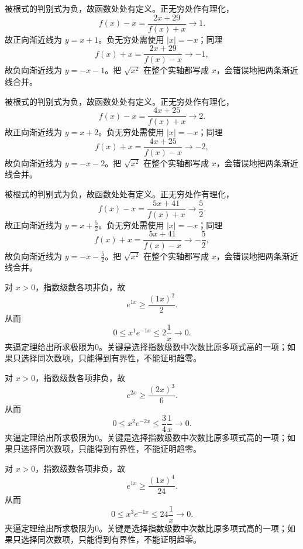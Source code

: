 \documentclass[12pt,fontset=fandol]{ctexart}
\begin{document}
\begin{solve}\label{ans:c4q4}
被根式的判别式为负，故函数处处有定义。正无穷处作有理化，
\[
f(x)-x=\frac{2x+29}{f(x)+x}\longrightarrow 1.
\]
故正向渐近线为 $y=x+1$。负无穷处需使用 $|x|=-x$；同理
\[
f(x)+x=\frac{2x+29}{f(x)-x}\longrightarrow-1,
\]
故负向渐近线为 $y=-x-1$。把 $\sqrt{x^2}$ 在整个实轴都写成 $x$，会错误地把两条渐近线合并。
\end{solve}

\begin{solve}\label{ans:c4q5}
被根式的判别式为负，故函数处处有定义。正无穷处作有理化，
\[
f(x)-x=\frac{4x+25}{f(x)+x}\longrightarrow 2.
\]
故正向渐近线为 $y=x+2$。负无穷处需使用 $|x|=-x$；同理
\[
f(x)+x=\frac{4x+25}{f(x)-x}\longrightarrow-2,
\]
故负向渐近线为 $y=-x-2$。把 $\sqrt{x^2}$ 在整个实轴都写成 $x$，会错误地把两条渐近线合并。
\end{solve}

\begin{solve}\label{ans:c4q6}
被根式的判别式为负，故函数处处有定义。正无穷处作有理化，
\[
f(x)-x=\frac{5x+41}{f(x)+x}\longrightarrow \frac{5}{2}.
\]
故正向渐近线为 $y=x+\frac{5}{2}$。负无穷处需使用 $|x|=-x$；同理
\[
f(x)+x=\frac{5x+41}{f(x)-x}\longrightarrow-\frac{5}{2},
\]
故负向渐近线为 $y=-x-\frac{5}{2}$。把 $\sqrt{x^2}$ 在整个实轴都写成 $x$，会错误地把两条渐近线合并。
\end{solve}

\begin{solve}\label{ans:c4q7}
对 $x>0$，指数级数各项非负，故
\[
e^{1x}\ge\frac{(1x)^{2}}{2}.
\]
从而
\[
0\le x^{1}e^{-1x}\le 2\frac1x\longrightarrow0.
\]
夹逼定理给出所求极限为0。关键是选择指数级数中次数比原多项式高的一项；如果只选择同次数项，只能得到有界性，不能证明趋零。
\end{solve}

\begin{solve}\label{ans:c4q8}
对 $x>0$，指数级数各项非负，故
\[
e^{2x}\ge\frac{(2x)^{3}}{6}.
\]
从而
\[
0\le x^{2}e^{-2x}\le \frac{3}{4}\frac1x\longrightarrow0.
\]
夹逼定理给出所求极限为0。关键是选择指数级数中次数比原多项式高的一项；如果只选择同次数项，只能得到有界性，不能证明趋零。
\end{solve}

\begin{solve}\label{ans:c4q9}
对 $x>0$，指数级数各项非负，故
\[
e^{1x}\ge\frac{(1x)^{4}}{24}.
\]
从而
\[
0\le x^{3}e^{-1x}\le 24\frac1x\longrightarrow0.
\]
夹逼定理给出所求极限为0。关键是选择指数级数中次数比原多项式高的一项；如果只选择同次数项，只能得到有界性，不能证明趋零。
\end{solve}
\end{document}
